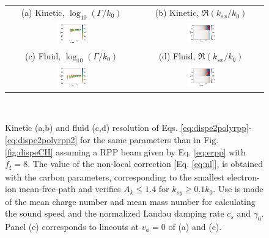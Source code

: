\documentclass[
 reprint,
 superscriptaddress,
 amsmath,amssymb,
 aps,
]{revtex4-1}
\begin{document}
\begin{figure}
\begin{tabular}{cc}
(a) Kinetic, $\log_{10}(\Gamma/k_0)$ &
(b)  Kinetic, $\Re(k_{sx}/k_0)$ \\
\includegraphics[width=0.24\textwidth]{gkCH.png}&
\includegraphics[width=0.24\textwidth]{kkCH.png}\\
(c) Fluid, $\log_{10}(\Gamma/k_0)$  &
(d) Fluid, $\Re(k_{sx}/k_0)$  \\
\includegraphics[width=0.24\textwidth]{gfCH.png}&
\includegraphics[width=0.24\textwidth]{kfCH.png}
\end{tabular}
\\
\caption{ \label{fig:dispeCHrpp}  
Kinetic (a,b) and fluid (c,d) resolution of Eqs. \eqref{eq:dispe2polyrpp}-\eqref{eq:dispe2polyrpp2} for  the same parameters than in Fig. \ref{fig:dispeCH} assuming a RPP beam given by Eq. \eqref{eq:erpp} with $f_\sharp=8$.  The value of the non-local correction [Eq. \eqref{eq:nl}], is obtained with the carbon parameters, corresponding to the smallest electron-ion mean-free-path  and  verifies $A_k\le 1.4$ for $k_{sy}\ge 0.1k_0$. Use is made of the mean charge number and mean mass number for calculating the sound speed and the normalized Landau damping rate $c_s$ and $\gamma_0$.
Panel (e) corresponds to lineouts at $v_\phi=0$  of  (a) and (c). 
 }
\end{figure}
\end{document}
